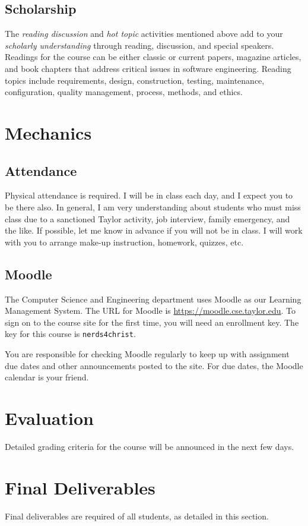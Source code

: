 \documentclass{article}
\begin{document}
\subsection{Scholarship}
\label{sec:orgheadline11}
The \emph{reading discussion} and \emph{hot topic} activities mentioned above
add to your \emph{scholarly understanding} through
reading, discussion, and special speakers.
Readings for the course can be either classic or current papers, magazine articles,
and book chapters that address critical issues in software engineering.  Reading topics
include requirements, design, construction, testing, maintenance, configuration, quality
management, process, methods, and ethics.
\section{Mechanics}
\label{sec:orgheadline15}
\subsection{Attendance}
\label{sec:orgheadline13}
Physical attendance is required. I will be in class each day, and I expect you to be there
also. In general, I am very understanding about students who must miss class due to a
sanctioned Taylor activity, job interview, family emergency, and the like. If possible,
let me know in advance if you will not be in class. I will work with you to arrange
make-up instruction, homework, quizzes, etc.

\subsection{Moodle}
\label{sec:orgheadline14}
The Computer Science and Engineering department uses Moodle as our Learning Management
System. The URL for Moodle is \url{https://moodle.cse.taylor.edu}.
To sign on to the course site for the first time, you will need an enrollment key.
The key for this course is \texttt{nerds4christ}.

You are responsible for checking Moodle regularly to keep up with assignment due dates and
other announcements posted to the site. For due dates, the Moodle calendar is your friend.

\section{Evaluation}
\label{sec:orgheadline16}
Detailed grading criteria for the course will be announced in the next few days.
\section{Final Deliverables}
\label{sec:orgheadline19}
Final deliverables are required of all students, as detailed in this section.
\end{document}

